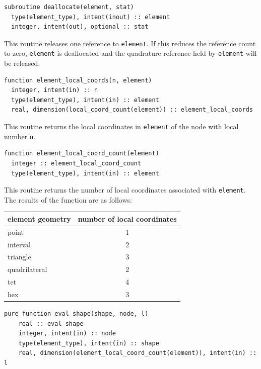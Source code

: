 \documentclass[a4paper, 11pt]{book}
\begin{document}

\begin{lstlisting}
subroutine deallocate(element, stat)
  type(element_type), intent(inout) :: element
  integer, intent(out), optional :: stat
\end{lstlisting}

This routine releases one reference to \lstinline+element+. If this reduces
the reference count to zero, \lstinline+element+ is deallocated and the
quadrature reference held by \lstinline+element+ will be released.


\begin{lstlisting}
function element_local_coords(n, element)
  integer, intent(in) :: n
  type(element_type), intent(in) :: element    
  real, dimension(local_coord_count(element)) :: element_local_coords
\end{lstlisting}

This routine returns the local coordinates in \lstinline+element+ of the
node with local number \lstinline+n+.


\begin{lstlisting}
function element_local_coord_count(element) 
  integer :: element_local_coord_count
  type(element_type), intent(in) :: element    
\end{lstlisting}

This routine returns the number of local coordinates associated with
\lstinline+element+. The results of the function are as follows:
\begin{center}
  \begin{tabular}{lc}
    \textbf{element geometry} & \textbf{number of local coordinates}\\\hline
    point & 1 \\
    interval & 2 \\
    triangle & 3 \\
    quadrilateral & 2 \\
    tet & 4 \\
    hex & 3
  \end{tabular}
\end{center}


\begin{lstlisting}
pure function eval_shape(shape, node, l)
    real :: eval_shape
    integer, intent(in) :: node
    type(element_type), intent(in) :: shape
    real, dimension(element_local_coord_count(element)), intent(in) :: l
\end{lstlisting}
\end{document}
